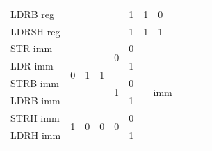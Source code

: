 \documentclass[a4paper,10pt]{report}
\begin{document}
\begin{table}[htb]
{\begin{tabular}{l|cccc|c|cc|cl|c|c|}
		\cline{1-1}\cline{6-8}
		LDRB reg  &                    &                    &                                         &                       & \multicolumn{1}{c}{1} & 1                  & 0                  &                                         &                   &                      &                       \\ 
		\cline{1-1}\cline{6-8}
		LDRSH reg &                    &                    &                                         &                       & \multicolumn{1}{c}{1} & 1                  & 1                  &                                         &                   &                      &                       \\ 
		\cline{1-10}
		STR imm   & \multirow{4}{*}{0} & \multirow{4}{*}{1} & \multicolumn{1}{c|}{\multirow{4}{*}{1}} & \multirow{2}{*}{0}    & 0                     & \multicolumn{4}{c|}{\multirow{6}{*}{imm}}                                                             &                      &                       \\ 
		\cline{1-1}\cline{6-6}
		LDR imm   &                    &                    & \multicolumn{1}{c|}{}                   &                       & 1                     & \multicolumn{4}{c|}{}                                                                                 &                      &                       \\ 
		\cline{1-1}\cline{5-6}
		STRB imm  &                    &                    & \multicolumn{1}{c|}{}                   & \multirow{2}{*}{1}    & 0                     & \multicolumn{4}{c|}{}                                                                                 &                      &                       \\ 
		\cline{1-1}\cline{6-6}
		LDRB imm  &                    &                    & \multicolumn{1}{c|}{}                   &                       & 1                     & \multicolumn{4}{c|}{}                                                                                 &                      &                       \\ 
		\cline{1-6}
		STRH imm  & \multirow{2}{*}{1} & \multirow{2}{*}{0} & \multirow{2}{*}{0}                      & \multirow{2}{*}{0}    & 0                     & \multicolumn{4}{c|}{}                                                                                 &                      &                       \\ 
		\cline{1-1}\cline{6-6}
		LDRH imm  &                    &                    &                                         &                       & 1                     & \multicolumn{4}{c|}{}                                                                                 &                      &                       \\ 

\end{tabular}}
\end{table}
\end{document}
